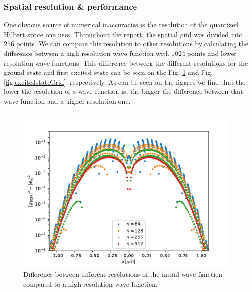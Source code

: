 \documentclass[aps,pra,reprint,superscriptaddress]{revtex4-1}
\begin{document}
\subsubsection{Spatial resolution \& performance}
One obvious source of numerical inaccuracies is the resolution of the quantized Hilbert space one uses. Throughout the report, the spatial grid was divided into $256$ points. We can compare this resolution to other resolutions by calculating the difference between a high resolution wave function with $1024$ points and lower resolution wave functions. This difference between the different resolutions for the ground state and first excited state can be seen on the Fig. \ref{fig:groundstateGrid} and Fig. \ref{fig:excitedstateGrid}, respectively. As can be seen on the figures we find that the lower the resolution of a wave function is, the bigger the difference between that wave function and a higher resolution one. \\
\begin{figure}
	\includegraphics[width=\columnwidth]{graphics/GroundstateGrid.pdf}
	\caption{Difference between different resolutions of the initial wave function compared to a high resolution wave function.}
	\label{fig:groundstateGrid}
\end{figure}
\end{document}
